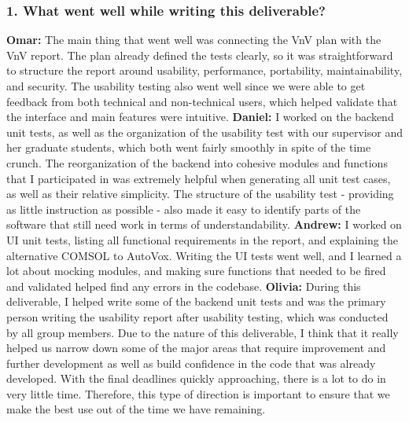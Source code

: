 \documentclass[12pt, titlepage]{article}
\begin{document}
\subsubsection*{1. What went well while writing this deliverable?}
\bigskip\bigskip
\textbf{Omar: } The main thing that went well was connecting the VnV plan with the VnV report. The plan already defined the tests clearly, so it was straightforward to structure the report around usability, performance, portability, maintainability, and security. The usability testing also went well since we were able to get feedback from both technical and non-technical users, which helped validate that the interface and main features were intuitive.
\newline
\newline
\textbf{Daniel: } I worked on the backend unit tests, as well as the organization of the usability test with our supervisor and her graduate students, which both went fairly smoothly in spite of the time crunch. The reorganization of the backend into cohesive modules and functions that I participated in was extremely helpful when generating all unit test cases, as well as their relative simplicity. The structure of the usability test - providing as little instruction as possible - also made it easy to identify parts of the software that still need work in terms of understandability.
\newline
\newline
\textbf{Andrew: } I worked on UI unit tests, listing all functional requirements in the report, and explaining the alternative COMSOL to AutoVox. Writing the UI tests went well, and I learned a lot about mocking modules, and making sure functions that needed to be fired and validated helped find any errors in the codebase.
\newline
\newline
\textbf{Olivia: } During this deliverable, I helped write some of the backend unit tests and was the primary person writing the usability report after usability testing, which was conducted by all group members. Due to the nature of this deliverable, I think that it really helped us narrow down some of the major areas that require improvement and further development as well as build confidence in the code that was already developed. With the final deadlines quickly approaching, there is a lot to do in very little time. Therefore, this type of direction is important to ensure that we make the best use out of the time we have remaining. 
\newline
\end{document}
